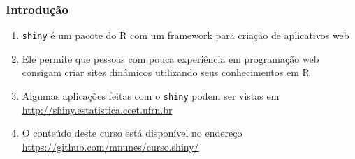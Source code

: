 \documentclass[12pt, compress, usetitleprogressbar]{beamer}\usepackage[]{graphicx}\usepackage[]{color}
\begin{document}








\begin{frame}

\frametitle{Introdução}

\begin{enumerate}[label=$\bullet$, leftmargin=*]

  \item \texttt{shiny} é um pacote do R com um framework para criação de aplicativos web

  \item Ele permite que pessoas com pouca experiência em programação web consigam criar sites dinâmicos utilizando seus conhecimentos em R

  \item Algumas aplicações feitas com o \texttt{shiny} podem ser vistas em \url{http://shiny.estatistica.ccet.ufrn.br}

  \item O conteúdo deste curso está disponível no endereço \url{https://github.com/mnunes/curso.shiny/}

\end{enumerate}

\end{frame}















\end{document}
